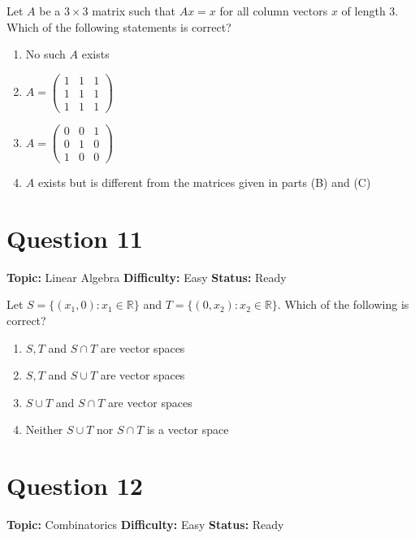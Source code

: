 \documentclass[11pt]{article}
\begin{document}
Let $A$ be a $3\times 3$ matrix such that $Ax=x$ for all column vectors $x$ of length $3$. Which of the following statements is correct?
\begin{enumerate}[label=(\Alph*)]
\item No such $A$ exists
\item $A=\begin{pmatrix}1&1&1\\1&1&1\\1&1&1\end{pmatrix}$
\item $A=\begin{pmatrix}0&0&1\\0&1&0\\1&0&0\end{pmatrix}$
\item $A$ exists but is different from the matrices given in parts (B) and (C)
\end{enumerate}

\newpage

\section*{Question 11}


\noindent\textbf{Topic:} Linear Algebra \quad \textbf{Difficulty:} Easy \quad \textbf{Status:} Ready



Let $S=\{(x_1,0):x_1\in\mathbb{R}\}$ and $T=\{(0,x_2):x_2\in\mathbb{R}\}$. Which of the following is correct?
\begin{enumerate}[label=(\Alph*)]
\item $S,T$ and $S\cap T$ are vector spaces
\item $S,T$ and $S\cup T$ are vector spaces
\item $S\cup T$ and $S\cap T$ are vector spaces
\item Neither $S\cup T$ nor $S\cap T$ is a vector space
\end{enumerate}

\newpage

\section*{Question 12}


\noindent\textbf{Topic:} Combinatorics \quad \textbf{Difficulty:} Easy \quad \textbf{Status:} Ready
\end{document}
